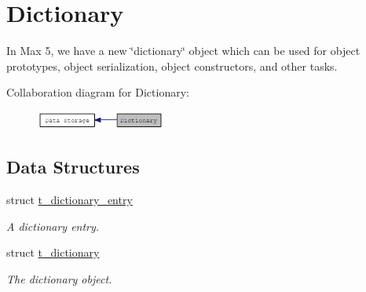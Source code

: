 \hypertarget{group__dictionary}{
\section{Dictionary}
\label{group__dictionary}
}


In Max 5, we have a new \char`\"{}dictionary\char`\"{} object which can be used for object prototypes, object serialization, object constructors, and other tasks.  


Collaboration diagram for Dictionary:\nopagebreak
\begin{figure}[H]
\begin{center}
\leavevmode
\includegraphics[width=120pt]{group__dictionary}
\end{center}
\end{figure}
\subsection*{Data Structures}
\begin{DoxyCompactItemize}
\item 
struct \hyperlink{structt__dictionary__entry}{t\_\-dictionary\_\-entry}
\begin{DoxyCompactList}\small\item\em A dictionary entry. \item\end{DoxyCompactList}\item 
struct \hyperlink{structt__dictionary}{t\_\-dictionary}
\begin{DoxyCompactList}\small\item\em The dictionary object. \item\end{DoxyCompactList}\end{DoxyCompactItemize}
